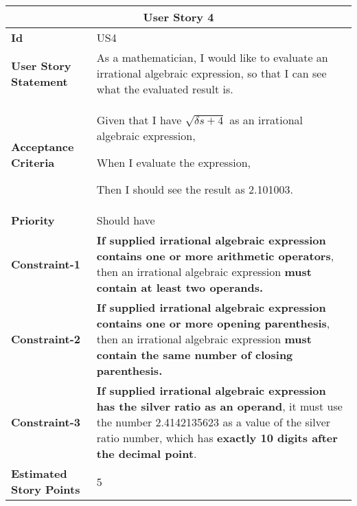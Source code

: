 \hspace{1cm}
\begin{center}
\begin{tabular}{ | m{2.3cm} | m{12cm} | } 

 \hline
 \multicolumn{2}{|c|}{\textbf{User Story 4}} \\

\hline
\textbf{Id} & US4 \\ 

\hline
\textbf{User Story Statement} & As a mathematician, I would like to evaluate an irrational algebraic expression, so that I can see what the evaluated result is. \\ 

\hline
\textbf{Acceptance Criteria} & Given that I have $\sqrt{\delta s + 4}$ as an irrational algebraic expression,

When I evaluate the expression,

Then I should see the result as 2.101003.\\

\hline
\textbf{Priority} & Should have \\ 

\hline
\textbf{Constraint-1} & \textbf{If supplied irrational algebraic expression contains one or more arithmetic operators}, then an irrational algebraic expression \textbf{must contain at least two operands.}\\

\hline
\textbf{Constraint-2} & \textbf{If supplied irrational algebraic expression contains one or more opening parenthesis}, then an irrational algebraic expression \textbf{must contain the same number of closing parenthesis.}\\

\hline
\textbf{Constraint-3} & \textbf{If supplied irrational algebraic expression has the silver ratio as an operand}, it must use the number 2.4142135623 as a value of the silver ratio number, which has \textbf{exactly 10 digits after the decimal point}.\\

\hline
\textbf{Estimated Story Points} & 5 \\ 
\hline

\end{tabular}
\end{center}

